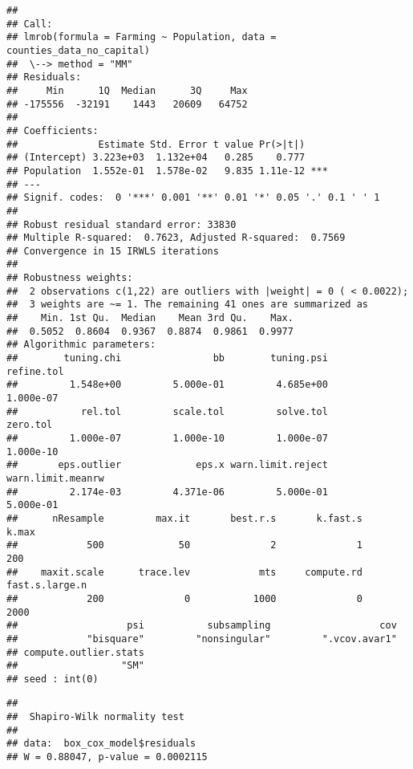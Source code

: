 \documentclass[
]{article}
\newenvironment{Shaded}{\begin{snugshade}}{\end{snugshade}}
\newcommand{\CommentTok}[1]{\textcolor[rgb]{0.56,0.35,0.01}{\textit{#1}}}
\newcommand{\FunctionTok}[1]{\textcolor[rgb]{0.13,0.29,0.53}{\textbf{#1}}}
\newcommand{\NormalTok}[1]{#1}
\newcommand{\SpecialCharTok}[1]{\textcolor[rgb]{0.81,0.36,0.00}{\textbf{#1}}}
\begin{document}
\begin{verbatim}
## 
## Call:
## lmrob(formula = Farming ~ Population, data = counties_data_no_capital)
##  \--> method = "MM"
## Residuals:
##     Min      1Q  Median      3Q     Max 
## -175556  -32191    1443   20609   64752 
## 
## Coefficients:
##              Estimate Std. Error t value Pr(>|t|)    
## (Intercept) 3.223e+03  1.132e+04   0.285    0.777    
## Population  1.552e-01  1.578e-02   9.835 1.11e-12 ***
## ---
## Signif. codes:  0 '***' 0.001 '**' 0.01 '*' 0.05 '.' 0.1 ' ' 1
## 
## Robust residual standard error: 33830 
## Multiple R-squared:  0.7623, Adjusted R-squared:  0.7569 
## Convergence in 15 IRWLS iterations
## 
## Robustness weights: 
##  2 observations c(1,22) are outliers with |weight| = 0 ( < 0.0022); 
##  3 weights are ~= 1. The remaining 41 ones are summarized as
##    Min. 1st Qu.  Median    Mean 3rd Qu.    Max. 
##  0.5052  0.8604  0.9367  0.8874  0.9861  0.9977 
## Algorithmic parameters: 
##        tuning.chi                bb        tuning.psi        refine.tol 
##         1.548e+00         5.000e-01         4.685e+00         1.000e-07 
##           rel.tol         scale.tol         solve.tol          zero.tol 
##         1.000e-07         1.000e-10         1.000e-07         1.000e-10 
##       eps.outlier             eps.x warn.limit.reject warn.limit.meanrw 
##         2.174e-03         4.371e-06         5.000e-01         5.000e-01 
##      nResample         max.it       best.r.s       k.fast.s          k.max 
##            500             50              2              1            200 
##    maxit.scale      trace.lev            mts     compute.rd fast.s.large.n 
##            200              0           1000              0           2000 
##                   psi           subsampling                   cov 
##            "bisquare"         "nonsingular"         ".vcov.avar1" 
## compute.outlier.stats 
##                  "SM" 
## seed : int(0)
\end{verbatim}

\begin{Shaded}
\end{Shaded}

\begin{verbatim}
## 
##  Shapiro-Wilk normality test
## 
## data:  box_cox_model$residuals
## W = 0.88047, p-value = 0.0002115
\end{verbatim}
\end{document}
